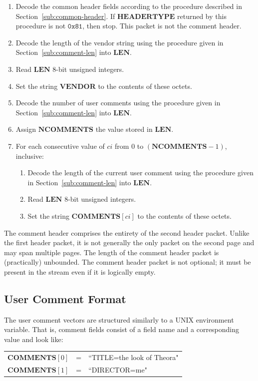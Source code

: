 \documentclass[11pt,letterpaper]{book}
\newcommand{\idx}[1]{{\ensuremath{\mathit{#1}}}}
\newcommand{\ci}{\idx{ci}}
\newcommand{\bitvar}[1]{\ensuremath{\mathbf{\bm #1}}}
\newcommand{\locvar}[1]{\ensuremath{\mathrm{#1}}}
\newcommand{\hex}[1]{\ensuremath{\mathtt{0x#1}}}
\numberwithin{equation}{chapter}
\numberwithin{figure}{chapter}
\numberwithin{table}{chapter}
\begin{document}
\begin{enumerate}
\item
Decode the common header fields according to the procedure described in
 Section~\ref{sub:common-header}.
If \bitvar{HEADERTYPE} returned by this procedure is not \hex{81}, then stop.
This packet is not the comment header.
\item
Decode the length of the vendor string using the procedure given in
 Section~\ref{sub:comment-len} into \bitvar{LEN}.
\item
Read \bitvar{LEN} 8-bit unsigned integers.
\item
Set the string \bitvar{VENDOR} to the contents of these octets.
\item
Decode the number of user comments using the procedure given in
 Section~\ref{sub:comment-len} into \bitvar{LEN}.
\item
Assign \bitvar{NCOMMENTS} the value stored in \bitvar{LEN}.
\item
For each consecutive value of \locvar{\ci} from $0$ to
 $(\bitvar{NCOMMENTS}-1)$, inclusive:
\begin{enumerate}
\item
Decode the length of the current user comment using the procedure given in
 Section~\ref{sub:comment-len} into \bitvar{LEN}.
\item
Read \bitvar{LEN} 8-bit unsigned integers.
\item
Set the string $\bitvar{COMMENTS}[\locvar{\ci}]$ to the contents of these
 octets.
\end{enumerate}
\end{enumerate}

The comment header comprises the entirety of the second header packet.
Unlike the first header packet, it is not generally the only packet on the
 second page and may span multiple pages.
The length of the comment header packet is (practically) unbounded.
The comment header packet is not optional; it must be present in the stream
 even if it is logically empty.


\subsection{User Comment Format}

The user comment vectors are structured similarly to a UNIX environment
 variable.
That is, comment fields consist of a field name and a corresponding value and
 look like:
\begin{center}
\begin{tabular}{rcl}
$\bitvar{COMMENTS}[0]$ & = & ``TITLE=the look of Theora" \\
$\bitvar{COMMENTS}[1]$ & = & ``DIRECTOR=me"
\end{tabular}
\end{center}
\end{document}
